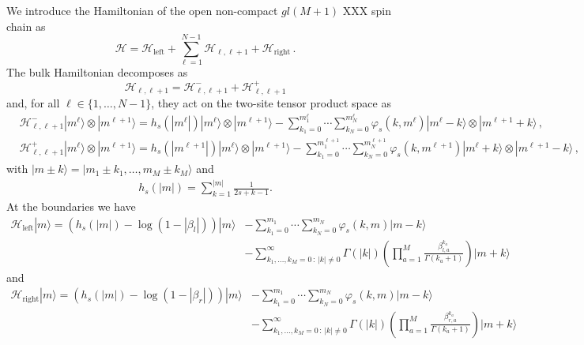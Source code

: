 \documentclass[11pt]{article}
\numberwithin{equation}{section}
\newcommand{\M}{M}
\newcommand{\N}{N}
\newcommand{\eH}{\mathcal{H}}
\begin{document}
We introduce the Hamiltonian of the open non-compact $gl(M+1)$ XXX spin chain as
\begin{equation}\label{Hamiltonian-MHarmonic}
 \eH=\eH_{\text{left}}+\sum_{\ell=1}^{N-1}\eH_{\ell,\ell+1}+\eH_{\text{right}}\,.
\end{equation}
The bulk Hamiltonian decomposes as
\begin{equation}\label{eq:dens}
    \eH_{\ell,\ell+1}=\eH_{\ell,\ell+1}^{-}+\eH_{\ell,\ell+1}^{+}
\end{equation}
and,  for all $\ell\in \{1,\ldots,\N-1\}$, they act on the two-site tensor product space as
\begin{equation}\label{hbulk}
\begin{split}
&\eH_{\ell,\ell+1}^{-}|m^{\ell}\rangle \otimes |m^{\ell+1}\rangle=h_s(|m^{\ell}|)|m^{\ell}\rangle \otimes |m^{\ell+1}\rangle-\sum_{k_{1}=0}^{m_{1}^{\ell}}\cdots \sum_{k_{N}=0}^{m_{N}^{\ell}}\varphi_{s}(k,m^{\ell}) |m^{\ell}-k\rangle \otimes |m^{\ell+1}+k\rangle\,,\\
&\eH_{\ell,\ell+1}^{+}|m^{\ell}\rangle \otimes |m^{\ell+1}\rangle=h_s(|m^{\ell+1}|)|m^{\ell}\rangle \otimes |m^{\ell+1}\rangle-\sum_{k_{1}=0}^{m_{1}^{\ell+1}}\cdots \sum_{k_{N}=0}^{m_{N}^{\ell+1}}\varphi_{s}(k,m^{\ell+1}) |m^{\ell}+k\rangle \otimes |m^{\ell+1}-k\rangle\,,
 \end{split}
\end{equation}
with $|m\pm k\rangle =|m_1\pm k_1,\ldots,m_M\pm k_M\rangle$ and
  \begin{align}
 	h_{s}(|m|)=\sum_{k=1}^{|m|}\frac{1}{2s+k-1}. \end{align}
 At the boundaries we have \begin{equation}\label{hleft}
\begin{split}
 \eH_{\text{left}}|m\rangle  =(h_s(|m|)-\log(1-|\beta_l|))|m\rangle &-\sum_{k_{1}=0}^{m_{1}}\cdots \sum_{k_{N}=0}^{m_{N}}\varphi_{s}(k,m) |m-k\rangle\\
  &-\sum_{k_{1},\ldots, k_{\M}=0\,:\,|k|\neq 0}^{\infty}\Gamma(|k|)\left(\prod_{a=1}^{\M}\frac{\beta_{l,a}^{k_{a}}}{\Gamma(k_{a}+1)}\right) |m+k\rangle
 \end{split}
\end{equation}
and
\begin{equation}\label{hright}
\begin{split}
 \eH_{\text{right}}|m\rangle =(h_s(|m|)-\log(1-|\beta_r|))|m\rangle &-\sum_{k_{1}=0}^{m_{1}}\cdots \sum_{k_{N}=0}^{m_{N}}\varphi_{s}(k,m) |m-k\rangle\\
  &-\sum_{k_{1},\ldots, k_{\M}=0\,:\,|k|\neq 0}^{\infty}\Gamma(|k|)\left(\prod_{a=1}^{\M}\frac{\beta_{r,a}^{k_{a}}}{\Gamma(k_{a}+1)}\right) |m+k\rangle
 \end{split}
\end{equation}
\end{document}
